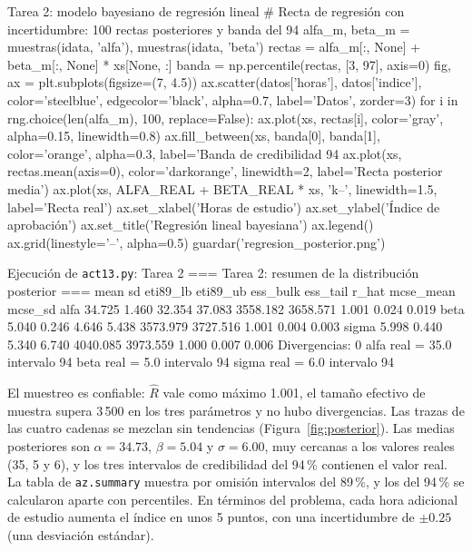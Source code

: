 \documentclass[11pt,letterpaper]{article}
\begin{document}
\begin{codigo}[label=cod:t2]{Tarea 2: modelo bayesiano de regresión lineal}
# Recta de regresión con incertidumbre: 100 rectas posteriores y banda del 94 %
alfa_m, beta_m = muestras(idata, 'alfa'), muestras(idata, 'beta')
rectas = alfa_m[:, None] + beta_m[:, None] * xs[None, :]
banda = np.percentile(rectas, [3, 97], axis=0)
fig, ax = plt.subplots(figsize=(7, 4.5))
ax.scatter(datos['horas'], datos['indice'], color='steelblue', edgecolor='black', alpha=0.7,
           label='Datos', zorder=3)
for i in rng.choice(len(alfa_m), 100, replace=False):
    ax.plot(xs, rectas[i], color='gray', alpha=0.15, linewidth=0.8)
ax.fill_between(xs, banda[0], banda[1], color='orange', alpha=0.3, label='Banda de credibilidad 94 %
ax.plot(xs, rectas.mean(axis=0), color='darkorange', linewidth=2, label='Recta posterior media')
ax.plot(xs, ALFA_REAL + BETA_REAL * xs, 'k--', linewidth=1.5, label='Recta real')
ax.set_xlabel('Horas de estudio')
ax.set_ylabel('Índice de aprobación')
ax.set_title('Regresión lineal bayesiana')
ax.legend()
ax.grid(linestyle='--', alpha=0.5)
guardar('regresion_posterior.png')
\end{codigo}

\begin{consola}[label=out:t2]{Ejecución de \texttt{act13.py}: Tarea 2}
=== Tarea 2: resumen de la distribución posterior ===
         mean     sd  eti89_lb  eti89_ub  ess_bulk  ess_tail  r_hat  mcse_mean  mcse_sd
alfa   34.725  1.460    32.354    37.083  3558.182  3658.571  1.001      0.024    0.019
beta    5.040  0.246     4.646     5.438  3573.979  3727.516  1.001      0.004    0.003
sigma   5.998  0.440     5.340     6.740  4040.085  3973.559  1.000      0.007    0.006
Divergencias: 0
alfa  real = 35.0  intervalo 94 %
beta  real = 5.0   intervalo 94 %
sigma real = 6.0   intervalo 94 %
\end{consola}

El muestreo es confiable: $\hat{R}$ vale como máximo 1.001, el tamaño efectivo de muestra supera 3\,500 en los tres parámetros y no hubo divergencias. Las trazas de las cuatro cadenas se mezclan sin tendencias (Figura~\ref{fig:posterior}). Las medias posteriores son $\alpha = 34.73$, $\beta = 5.04$ y $\sigma = 6.00$, muy cercanas a los valores reales (35, 5 y 6), y los tres intervalos de credibilidad del 94\,\% contienen el valor real. La tabla de \texttt{az.summary} muestra por omisión intervalos del 89\,\%, y los del 94\,\% se calcularon aparte con percentiles. En términos del problema, cada hora adicional de estudio aumenta el índice en unos 5 puntos, con una incertidumbre de $\pm 0.25$ (una desviación estándar).
\end{document}
